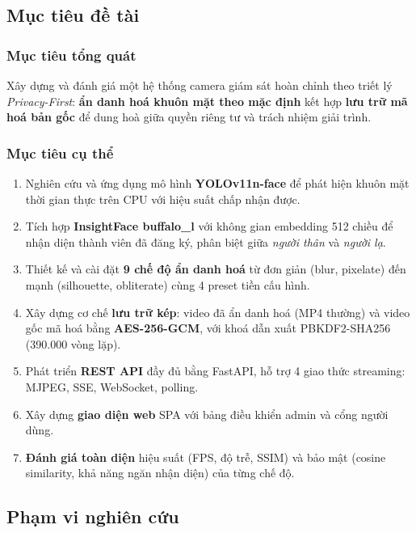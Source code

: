 \subsection{Mục tiêu đề tài}
\label{subsec:muctieu}

\subsubsection{Mục tiêu tổng quát}

Xây dựng và đánh giá một hệ thống camera giám sát hoàn chỉnh theo triết lý \textit{Privacy-First}: \textbf{ẩn danh hoá khuôn mặt theo mặc định} kết hợp \textbf{lưu trữ mã hoá bản gốc} để dung hoà giữa quyền riêng tư và trách nhiệm giải trình.

\subsubsection{Mục tiêu cụ thể}

\begin{enumerate}[1.]
    \item Nghiên cứu và ứng dụng mô hình \textbf{YOLOv11n-face} để phát hiện khuôn mặt thời gian thực trên CPU với hiệu suất chấp nhận được.
    \item Tích hợp \textbf{InsightFace buffalo\_l} với không gian embedding 512 chiều để nhận diện thành viên đã đăng ký, phân biệt giữa \textit{người thân} và \textit{người lạ}.
    \item Thiết kế và cài đặt \textbf{9 chế độ ẩn danh hoá} từ đơn giản (blur, pixelate) đến mạnh (silhouette, obliterate) cùng 4 preset tiền cấu hình.
    \item Xây dựng cơ chế \textbf{lưu trữ kép}: video đã ẩn danh hoá (MP4 thường) và video gốc mã hoá bằng \textbf{AES-256-GCM}, với khoá dẫn xuất PBKDF2-SHA256 (390.000 vòng lặp).
    \item Phát triển \textbf{REST API} đầy đủ bằng FastAPI, hỗ trợ 4 giao thức streaming: MJPEG, SSE, WebSocket, polling.
    \item Xây dựng \textbf{giao diện web} SPA với bảng điều khiển admin và cổng người dùng.
    \item \textbf{Đánh giá toàn diện} hiệu suất (FPS, độ trễ, SSIM) và bảo mật (cosine similarity, khả năng ngăn nhận diện) của từng chế độ.
\end{enumerate}

\subsection{Phạm vi nghiên cứu}
\label{subsec:phamvi}

